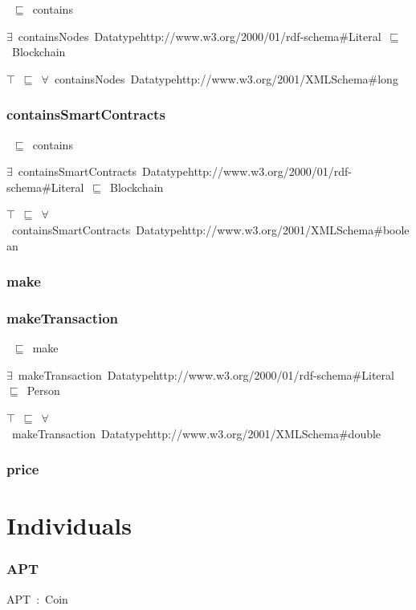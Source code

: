 \documentclass{article}
\begin{document}
~\ensuremath{\sqsubseteq}~contains

\ensuremath{\exists}~containsNodes~Datatypehttp://www.w3.org/2000/01/rdf-schema#Literal~\ensuremath{\sqsubseteq}~Blockchain

\ensuremath{\top}~\ensuremath{\sqsubseteq}~\ensuremath{\forall}~containsNodes~Datatypehttp://www.w3.org/2001/XMLSchema#long

\subsubsection*{containsSmartContracts}

~\ensuremath{\sqsubseteq}~contains

\ensuremath{\exists}~containsSmartContracts~Datatypehttp://www.w3.org/2000/01/rdf-schema#Literal~\ensuremath{\sqsubseteq}~Blockchain

\ensuremath{\top}~\ensuremath{\sqsubseteq}~\ensuremath{\forall}~containsSmartContracts~Datatypehttp://www.w3.org/2001/XMLSchema#boolean

\subsubsection*{make}

\subsubsection*{makeTransaction}

~\ensuremath{\sqsubseteq}~make

\ensuremath{\exists}~makeTransaction~Datatypehttp://www.w3.org/2000/01/rdf-schema#Literal~\ensuremath{\sqsubseteq}~Person

\ensuremath{\top}~\ensuremath{\sqsubseteq}~\ensuremath{\forall}~makeTransaction~Datatypehttp://www.w3.org/2001/XMLSchema#double

\subsubsection*{price}

\section*{Individuals}\subsubsection*{APT}

APT~:~Coin
\end{document}
